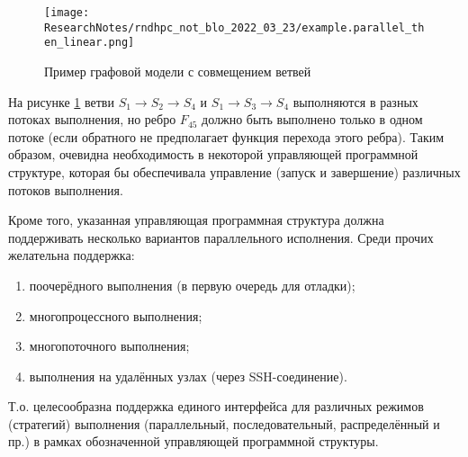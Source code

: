 \begin{figure}[!ht]
    \centering
    \texttt{[image: ResearchNotes/rndhpc\_not\_blo\_2022\_03\_23/example.parallel\_then\_linear.png]}
    \caption{Пример графовой модели с совмещением ветвей}
    \label{fig:parallelThenLinearExample}
\end{figure}

На рисунке \ref{fig:parallelThenLinearExample} ветви $S_1 \rightarrow S_2 \rightarrow S_4$ и $S_1 \rightarrow S_3 \rightarrow S_4$ выполняются в разных потоках выполнения, но ребро $F_{45}$ должно быть выполнено только в одном потоке (если обратного не предполагает функция перехода этого ребра). Таким образом, очевидна необходимость в некоторой управляющей программной структуре, которая бы обеспечивала управление (запуск и завершение) различных потоков выполнения.

Кроме того, указанная управляющая программная структура должна поддерживать несколько вариантов параллельного исполнения. Среди прочих желательна поддержка:
\begin{enumerate}[label=\arabic*)]
    \item поочерёдного выполнения (в первую очередь для отладки);
    \item многопроцессного выполнения;
    \item многопоточного выполнения;
    \item выполнения на удалённых узлах (через SSH-соединение).
\end{enumerate}

Т.о. целесообразна поддержка единого интерфейса для различных режимов (стратегий) выполнения (параллельный, последовательный, распределённый и пр.) в рамках обозначенной управляющей программной структуры. %

\noteattributes{}

